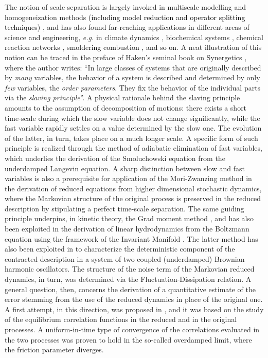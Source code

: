 \documentclass[a4paper,twoside]{article}      %
\theoremstyle{definition}
\newcommand{\AM}{\textcolor{black}}
\begin{document}
The notion of scale separation is largely invoked in multiscale modelling and homogeneization methods \AM{(including model reduction and operator splitting techniques)} \cite{givon2004extracting,pavliotis2008multiscale}, and has also found far-reaching applications in different areas of science \AM{and engineering}, \textit{e.g.} in climate dynamics \cite{Ghil20},  biochemical systems \cite{Schnell17}, chemical reaction networks \cite{Kang2013}, \AM{smoldering combustion \cite{Ijioma2014}, and so on}. %
A neat illustration of this \AM{notion} can be traced
in the preface of Haken's seminal book on Synergetics \cite{Haken2004}, where the author writes: ``In large classes of systems that are originally described by \textit{many} variables, the behavior of a system is described and determined by only \textit{few} variables, the \textit{order parameters}. They fix the behavior of the individual parts via the \textit{slaving principle}''. A physical rationale behind the slaving principle amounts to the assumption of decomposition of motions: there exists a short time-scale during which the slow variable does not change significantly, while the fast variable rapidly settles on a value determined by the slow one. The evolution of the latter, in turn, takes place on a much longer scale. 
A specific form of such principle is realized through the method of adiabatic elimination of fast variables, which underlies the derivation of the Smoluchowski equation from the underdamped Langevin equation. A sharp distinction between slow and fast variables is also a prerequisite for application of the Mori-Zwanzing method \cite{Zwanzig} in the derivation of reduced equations from higher dimensional stochastic dynamics, where the Markovian structure of the original process is preserved in the reduced description by stipulating a perfect time-scale separation.
The same guiding principle underpins, in kinetic theory, the Grad moment method \cite{Grad49,colan07b},  and has also been exploited in the derivation of linear hydrodynamics from the Boltzmann equation using the framework of the Invariant Manifold \cite{GorKar05,colan09}. 
The latter method has also been exploited in \cite{CDM22} to characterize the deterministic component of the contracted description in a system of two coupled (underdamped) Brownian harmonic oscillators. The structure of the noise term of the Markovian reduced dynamics, in turn, was determined via the Fluctuation-Dissipation relation. A general question, then, concerns the derivation of a quantitative estimate of the error stemming from the use of the reduced dynamics in place of the original one.
A first attempt, in this direction, was proposed in \cite{CM22}, and it was based on the study of the equilibrium correlation functions in the reduced and in the original processes. A uniform-in-time type of convergence of the correlations evaluated in the two processes was proven to hold in the so-called overdamped limit, where the friction parameter diverges.
\end{document}
